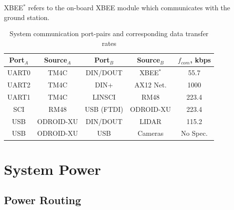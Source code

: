 			\begin{table}[h!]
				{\footnotesize XBEE$^*$ refers to the on-board XBEE module which communicates with the ground station.}
				\centering
				\begin{tabularx}{\textwidth}{|C{0.2}|C{0.2}||C{0.2}|C{0.2}||C{0.2}|} 	
					\hline
					\bf{Port$_A$} &	\bf{Source$_A$}	&	\bf{Port$_B$}& 	\bf{Source$_B$}	& 	\bf{$f_{com}$, kbps}\\	\hline \hline
					UART0 		&	TM4C			&	DIN/DOUT	&	XBEE$^*$		&	55.7 				\\	\hline
					UART2		&	TM4C			&	DIN+		&	AX12 Net.		&	1000				\\ 	\hline
					UART1		&	TM4C			&	LINSCI		&	RM48			&	223.4				\\ 	\hline
					SCI			&	RM48			&	USB (FTDI)	&	ODROID-XU		&	223.4				\\ 	\hline
					USB			&	ODROID-XU		&	DIN/DOUT 	&	LIDAR 			& 	115.2				\\	\hline
					USB			&	ODROID-XU		&	USB			&	Cameras	 		& 	No Spec.			\\	\hline
				\end{tabularx} 
				\caption{System communication port-pairs and corresponding data transfer rates}
				\label{tab::comm_port_pairs}
			\end{table}


	\section{System Power}

		\subsection{Power Routing}

